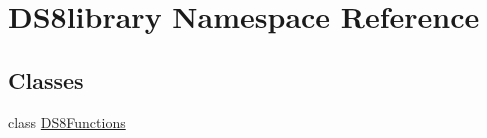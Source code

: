 \hypertarget{namespace_d_s8library}{}\section{D\+S8library Namespace Reference}
\label{namespace_d_s8library}
\subsection*{Classes}
\begin{DoxyCompactItemize}
\item 
class \hyperlink{class_d_s8library_1_1_d_s8_functions}{D\+S8\+Functions}
\end{DoxyCompactItemize}
